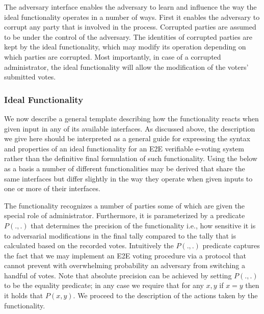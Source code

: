 The adversary interface enables the adversary to learn and influence
the way the ideal functionality operates in a number of ways. First it
enables the adversary to corrupt any party that is involved in the
process. Corrupted parties are assumed to be under the control of the
adversary. The identities of corrupted parties are kept by the ideal
functionality, which may modify its operation depending on which
parties are corrupted. Most importantly, in case of a corrupted
administrator, the ideal functionality will allow the modification of
the voters’ submitted votes.

\subsubsection{Ideal Functionality}

We now describe a general template describing how the functionality
reacts when given input in any of its available interfaces. As
discussed above, the description we give here should be interpreted as
a general guide for expressing the syntax and properties of an ideal
functionality for an E2E verifiable e-voting system rather than the
definitive final formulation of such functionality. Using the below as
a basis a number of different functionalities may be derived that
share the same interfaces but differ slightly in the way they operate
when given inputs to one or more of their interfaces.

The functionality recognizes a number of parties some of which are
given the special role of administrator. Furthermore, it is
parameterized by a predicate $P(.,.)$ that determines the precision of
the functionality i.e., how sensitive it is to adversarial
modifications in the final tally compared to the tally that is
calculated based on the recorded votes. Intuitively the $P(.,.)$
predicate captures the fact that we may implement an E2E voting
procedure via a protocol that cannot prevent with overwhelming
probability an adversary from switching a handful of votes. Note that
absolute precision can be achieved by setting $P(.,.)$ to be the
equality predicate; in any case we require that for any $x,y$ if $x=y$
then it holds that $P(x,y)$. We proceed to the description of the
actions taken by the functionality.

